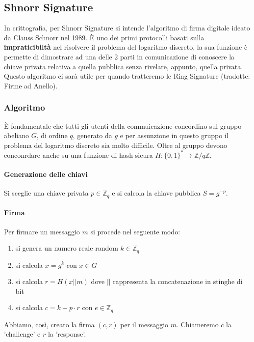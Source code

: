 \documentclass[12pt,a4paper]{article}
\begin{document}
\subsection{Shnorr Signature}
In crittografia, per Shnorr Signature si intende l'algoritmo di firma digitale
ideato da Clauss Schnorr nel 1989. È uno dei primi protocolli basati sulla
\textbf{impraticibiltà} nel risolvere il problema del logaritmo discreto, la sua
funzione è permette di dimostrare ad una delle 2 parti in comunicazione di
conoscere la chiave privata relativa a quella pubblica senza rivelare, appunto,
quella privata. Questo algoritmo ci sarà utile per quando tratteremo le Ring
Signature (tradotte: Firme ad Anello).

\subsubsection{Algoritmo}

È fondamentale che tutti gli utenti della commuicazione concordino sul gruppo
abeliano $ G $, di ordine $ q $, generato da $ g $ e per assunzione in questo
gruppo il problema del logaritmo discreto sia molto difficile. Oltre al gruppo
devono conconrdare anche su una funzione di hash sicura $ H:\{0,1\}^*
\rightarrow \mathbb{Z} / q\mathbb{Z} $.

\paragraph{Generazione delle chiavi}
Si sceglie una chiave privata $ p \in \mathbb{Z}_q $ e si calcola la chiave
pubblica $ S = g^{-p} $.

\paragraph{Firma}
Per firmare un messaggio $ m $ si procede nel seguente modo:
\begin{enumerate}
    \item si genera un numero reale random $ k \in \mathbb{Z}_q $
    \item si calcola $ x = g^k $ con $ x \in G $ 
    \item si calcola $ r = H(x || m) $ dove $ || $ rappresenta la concatenazione
    in stinghe di bit
    \item si calcola $ c = k + p \cdot r $ con $ e \in \mathbb{Z}_q $
\end{enumerate}

Abbiamo, così, creato la firma $ (c, r) $ per il messaggio $ m $. Chiameremo $ c
$ la 'challenge' e $ r $ la 'response'.
\end{document}
